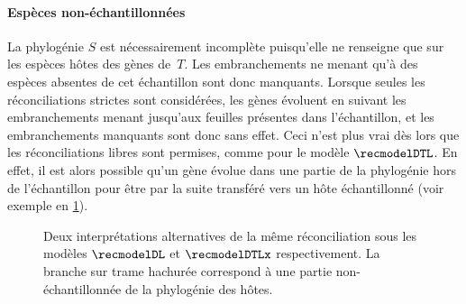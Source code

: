 {%

\paragraph{Espèces non-échantillonnées~\textup{\parencite{Szoelloesi2013LateralGeneTransfer,Weiner2021ImprovedDuplicationTransfer}}}
La phylogénie \(S\) est nécessairement incomplète puisqu’elle ne renseigne que sur les espèces hôtes des gènes de~\(T\).
Les embranchements ne menant qu’à des espèces absentes de cet échantillon sont donc manquants.
Lorsque seules les réconciliations strictes sont considérées, les gènes évoluent en suivant les embranchements menant jusqu’aux feuilles présentes dans l’échantillon, et les embranchements manquants sont donc sans effet.
Ceci n’est plus vrai dès lors que les réconciliations libres sont permises, comme pour le modèle \(\recmodelDTL\).
En effet, il est alors possible qu’un gène évolue dans une partie de la phylogénie hors de l’échantillon pour être par la suite transféré vers un hôte échantillonné (voir exemple en \cref{figure:rec-dtlx}).

\begin{figure}[htb]
    \capstart
    \centering
    
    \caption{
        Deux interprétations alternatives de la même réconciliation sous les modèles \(\recmodelDL\) et \(\recmodelDTLx\) respectivement.
        La branche sur trame hachurée correspond à une partie non-échantillonnée de la phylogénie des hôtes.
    }
    \label{figure:rec-dtlx}
\end{figure}

}

